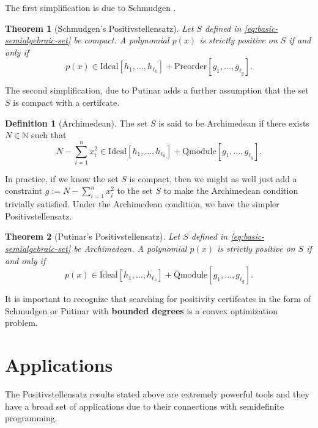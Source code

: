 \documentclass[
]{book}
\newtheorem{theorem}{Theorem}[chapter]
\theoremstyle{definition}
\newtheorem{definition}{Definition}[chapter]
\theoremstyle{definition}
\theoremstyle{definition}
\theoremstyle{definition}
\theoremstyle{remark}
\begin{document}
The first simplification is due to Schmudgen \citep{Schmudgen91ma-moment}.

\begin{theorem}[Schmudgen's Positivstellensatz]
\protect\hypertarget{thm:Schmudgen}{}\label{thm:Schmudgen}Let \(S\) defined in \eqref{eq:basic-semialgebraic-set} be compact. A polynomial \(p(x)\) is strictly positive on \(S\) if and only if
\[
p(x) \in \mathrm{Ideal}[h_1,\dots,h_{\ell_h}] + \mathrm{Preorder}[g_1,\dots,g_{\ell_g}].
\]
\end{theorem}

The second simplification, due to Putinar \citep{putinar93-positive} adds a further assumption that the set \(S\) is compact with a certifcate.

\begin{definition}[Archimedean]
\protect\hypertarget{def:Archimedean}{}\label{def:Archimedean}The set \(S\) is said to be Archimedean if there exists \(N \in \mathbb{N}\) such that
\[
N - \sum_{i=1}^n x_i^2 \in \mathrm{Ideal}[h_1,\dots,h_{\ell_h}] + \mathrm{Qmodule}[g_1,\dots,g_{\ell_g}].
\]
\end{definition}

In practice, if we know the set \(S\) is compact, then we might as well just add a constraint \(g:=N - \sum_{i=1}^{n} x_i^2\) to the set \(S\) to make the Archimedean condition trivially satisfied. Under the Archimedean condition, we have the simpler Positivstellensatz.

\begin{theorem}[Putinar's Positivstellensatz]
\protect\hypertarget{thm:Putinar}{}\label{thm:Putinar}Let \(S\) defined in \eqref{eq:basic-semialgebraic-set} be Archimedean. A polynomial \(p(x)\) is strictly positive on \(S\) if and only if
\[
p(x) \in \mathrm{Ideal}[h_1,\dots,h_{\ell_h}] + \mathrm{Qmodule}[g_1,\dots,g_{\ell_g}].
\]
\end{theorem}

It is important to recognize that searching for positivity certifcates in the form of Schmudgen or Putinar with \textbf{bounded degrees} is a convex optimization problem.

\section{Applications}\label{applications-1}

The Positivstellensatz results stated above are extremely powerful tools and they have a broad set of applications due to their connections with semidefinite programming.
\end{document}
